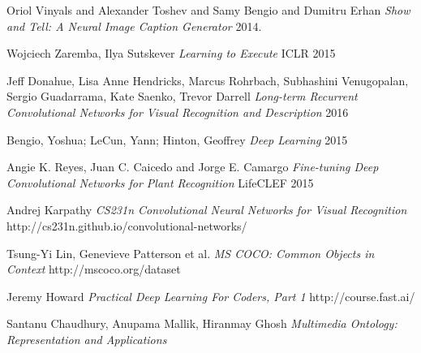 \documentclass[11pt]{article}
\begin{document}
	\begin{thebibliography}{1}
	
	   Oriol Vinyals and
               Alexander Toshev and
               Samy Bengio and
               Dumitru Erhan {\em Show and Tell: {A} Neural Image Caption Generator} 2014.

         Wojciech Zaremba, Ilya Sutskever {\em Learning to Execute} ICLR 2015
         

          Jeff Donahue, Lisa Anne Hendricks, Marcus Rohrbach, Subhashini Venugopalan, Sergio Guadarrama, Kate Saenko, Trevor Darrell {\em Long-term Recurrent Convolutional Networks for Visual Recognition and Description} 2016

          Bengio, Yoshua; LeCun, Yann; Hinton, Geoffrey {\em Deep Learning} 2015

          Angie K. Reyes, Juan C. Caicedo and Jorge E. Camargo {\em Fine-tuning Deep Convolutional Networks for
		Plant Recognition} LifeCLEF 2015

          Andrej Karpathy {\em 
			CS231n Convolutional Neural Networks for Visual Recognition
		} http://cs231n.github.io/convolutional-networks/

		 Tsung-Yi Lin, Genevieve Patterson et al. {\em MS COCO: Common Objects in Context
		}  http://mscoco.org/dataset

		 Jeremy Howard {\em Practical Deep Learning For Coders, Part 1
		}  http://course.fast.ai/

		 Santanu Chaudhury, Anupama Mallik, Hiranmay Ghosh {\em Multimedia Ontology: Representation and Applications
		} 

	\end{thebibliography}
\end{document}
